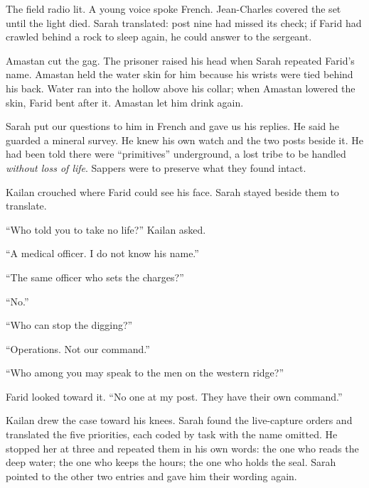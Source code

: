 The field radio lit. A young voice spoke French. Jean-Charles covered the set until the light died. Sarah translated: post nine had missed its check; if Farid had crawled behind a rock to sleep again, he could answer to the sergeant.\par

Amastan cut the gag. The prisoner raised his head when Sarah repeated Farid's name. Amastan held the water skin for him because his wrists were tied behind his back. Water ran into the hollow above his collar; when Amastan lowered the skin, Farid bent after it. Amastan let him drink again.\par

Sarah put our questions to him in French and gave us his replies. He said he guarded a mineral survey. He knew his own watch and the two posts beside it. He had been told there were ``primitives'' underground, a lost tribe to be handled \emph{without loss of life}. Sappers were to preserve what they found intact.\par

Kailan crouched where Farid could see his face. Sarah stayed beside them to translate.\par

``Who told you to take no life?'' Kailan asked.\par

``A medical officer. I do not know his name.''\par

``The same officer who sets the charges?''\par

``No.''\par

``Who can stop the digging?''\par

``Operations. Not our command.''\par

``Who among you may speak to the men on the western ridge?''\par

Farid looked toward it. ``No one at my post. They have their own command.''\par

Kailan drew the case toward his knees. Sarah found the live-capture orders and translated the five priorities, each coded by task with the name omitted. He stopped her at three and repeated them in his own words: the one who reads the deep water; the one who keeps the hours; the one who holds the seal. Sarah pointed to the other two entries and gave him their wording again.\par

